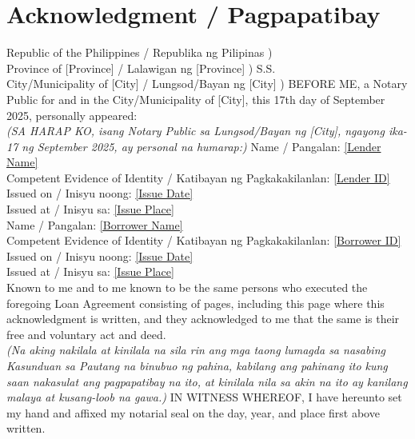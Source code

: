 \documentclass[a4paper,12pt]{article}
\begin{document}
\section*{Acknowledgment / Pagpapatibay}
Republic of the Philippines / Republika ng Pilipinas ) \\
Province of [Province] / Lalawigan ng [Province] ) S.S. \\
City/Municipality of [City] / Lungsod/Bayan ng [City] )
\vspace{0.5cm}
BEFORE ME, a Notary Public for and in the City/Municipality of [City], this 17th day of September 2025, personally appeared: \\
\textit{(SA HARAP KO, isang Notary Public sa Lungsod/Bayan ng [City], ngayong ika-17 ng September 2025, ay personal na humarap:)}
\vspace{0.3cm}
Name / Pangalan: \underline{[Lender Name]} \\
Competent Evidence of Identity / Katibayan ng Pagkakakilanlan: \underline{[Lender ID]} \\
Issued on / Inisyu noong: \underline{[Issue Date]} \\
Issued at / Inisyu sa: \underline{[Issue Place]} \\
\vspace{0.3cm}
Name / Pangalan: \underline{[Borrower Name]} \\
Competent Evidence of Identity / Katibayan ng Pagkakakilanlan: \underline{[Borrower ID]} \\
Issued on / Inisyu noong: \underline{[Issue Date]} \\
Issued at / Inisyu sa: \underline{[Issue Place]} \\
\vspace{0.5cm}
Known to me and to me known to be the same persons who executed the foregoing Loan Agreement consisting of \pageref{LastPage} pages, including this page where this acknowledgment is written, and they acknowledged to me that the same is their free and voluntary act and deed. \\
\textit{(Na aking nakilala at kinilala na sila rin ang mga taong lumagda sa nasabing Kasunduan sa Pautang na binubuo ng \pageref{LastPage} pahina, kabilang ang pahinang ito kung saan nakasulat ang pagpapatibay na ito, at kinilala nila sa akin na ito ay kanilang malaya at kusang-loob na gawa.)}
\vspace{0.5cm}
IN WITNESS WHEREOF, I have hereunto set my hand and affixed my notarial seal on the day, year, and place first above written. \\
\end{document}
